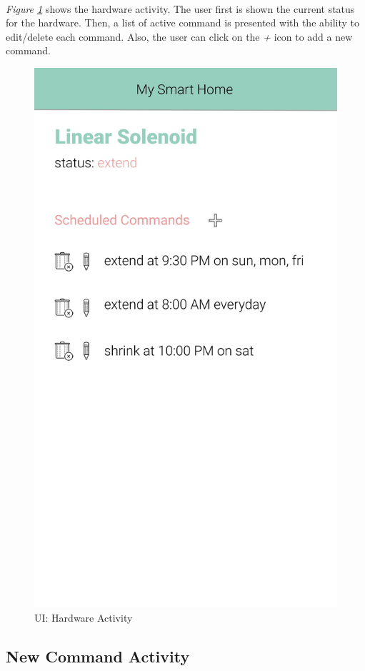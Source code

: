 \documentclass[12pt, oneside, a4paper]{book}
\begin{document}
		\paragraph{} \textit{Figure \ref{fig:activity_hardware}} shows the hardware activity. The user first is shown the current status for the hardware. Then, a list of active command is presented with the ability to edit/delete each command. Also, the user can click on the \textit{+} icon to add a new command.
		\begin{figure}[H]
			\centering
			\includegraphics[width=.5\linewidth]{img/activity_hardware.jpg}
			\caption{UI: Hardware Activity}
			\label{fig:activity_hardware}
		\end{figure}
		\newpage\subsection{New Command Activity}
\end{document}
